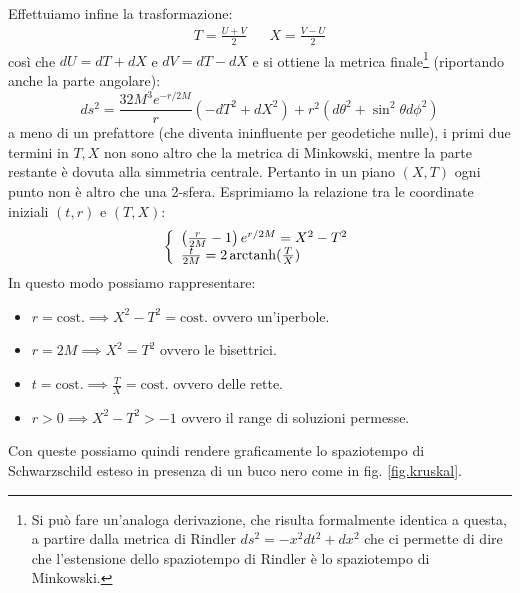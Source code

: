 Effettuiamo infine la trasformazione:
\begin{align}
    T=\frac{U+V}{2} && X=\frac{V-U}{2}
    \label{eq.coordinateTX_kruskal}
\end{align}
così che $dU=dT+dX$ e $dV=dT-dX$ e si ottiene la metrica finale\footnote{Si può fare un'analoga derivazione, che risulta formalmente identica a questa, a partire dalla metrica di Rindler $ds^2 = -x^2dt^2 + dx^2$ che ci permette di dire che l'estensione dello spaziotempo di Rindler è lo spaziotempo di Minkowski.} (riportando anche la parte angolare):
\begin{equation}
    ds^2 = \frac{32M^3 e^{-r/2M}}{r}( - dT^2 + dX^2) + r^2(d\theta^2 + \sin^2\theta d\phi^2)
    \label{eq.metrica_kruskal}
\end{equation}
a meno di un prefattore (che diventa ininfluente per geodetiche nulle), i primi due termini in $T, X$ non sono altro che la metrica di Minkowski, mentre la parte restante è dovuta alla simmetria centrale. Pertanto in un piano $(X,T)$ ogni punto non è altro che una 2-sfera. Esprimiamo la relazione tra le coordinate iniziali $(t,r)$ e $(T,X)$:
\begin{equation}
    \left\{ \begin{array}{l}
          \left(\frac{r}{2M}-1\right) e^{r/2M} = X^2 - T^2 \\
          \frac{t}{2M}= 2\operatorname{arctanh} (\frac{T}{X})
    \end{array}\right.
\end{equation}
In questo modo possiamo rappresentare:
\begin{itemize}
    \item $r=\textrm{cost.} \implies X^2 - T^2 = \textrm{cost.}$ ovvero  un'iperbole.
    \item $r=2M \implies X^2 = T^2$ ovvero le bisettrici.
    \item $t=\textrm{cost.} \implies \frac{T}{X} = \textrm{cost.}$ ovvero delle rette.
    \item $r>0 \implies X^2-T^2 > -1$ ovvero il range di soluzioni permesse.
\end{itemize}
Con queste possiamo quindi rendere graficamente lo spaziotempo di Schwarzschild esteso in presenza di un buco nero come in fig. \ref{fig.kruskal}.
